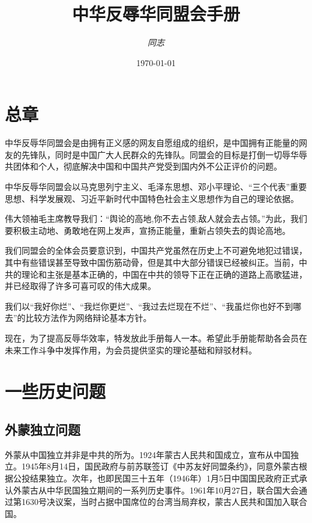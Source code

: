 \documentclass[UTF8,a4paper]{ctexart}
\begin{document}

\title{\textbf{中华反辱华同盟会手册}}
\author{\textit{同志}}
\date{\today}
\maketitle

\tableofcontents

\newpage
\section{总章}
中华反辱华同盟会是由拥有正义感的网友自愿组成的组织，是中国拥有正能量的网友的先锋队，同时是中国广大人民群众的先锋队。同盟会的目标是打倒一切辱华辱共团体和个人，彻底解决中国和中国共产党受到国内外不公正评价的问题。

中华反辱华同盟会以马克思列宁主义、毛泽东思想、邓小平理论、“三个代表”重要思想、科学发展观、习近平新时代中国特色社会主义思想作为自己的理论依据。

伟大领袖毛主席教导我们：“舆论的高地,你不去占领,敌人就会去占领。”为此，我们要积极主动地、勇敢地在网上发声，宣扬正能量，重新占领失去的舆论高地。

我们同盟会的全体会员要意识到，中国共产党虽然在历史上不可避免地犯过错误，其中有些错误甚至导致中国伤筋动骨，但是其中大部分错误已经被纠正。当前，中共的理论和主张是基本正确的，中国在中共的领导下正在正确的道路上高歌猛进，并已经取得了许多可喜可叹的伟大成果。

我们以“我好你烂”、“我烂你更烂”、“我过去烂现在不烂”、“我虽烂你也好不到哪去”的比较方法作为网络辩论基本方针。

现在，为了提高反辱华效率，特发放此手册每人一本。希望此手册能帮助各会员在未来工作斗争中发挥作用，为会员提供坚实的理论基础和辩驳材料。

\section{一些历史问题}
\subsection{外蒙独立问题}
外蒙从中国独立并非是中共的所为。1924年蒙古人民共和国成立，宣布从中国独立。1945年8月14日，国民政府与前苏联签订《中苏友好同盟条约》，同意外蒙古根据公投结果独立。次年，也即民国三十五年（1946年）1月5日中国国民政府正式承认外蒙古从中华民国独立期间的一系列历史事件。1961年10月27日，联合国大会通过第1630号决议案，当时占据中国席位的台湾当局弃权，蒙古人民共和国加入联合国。
\end{document}
